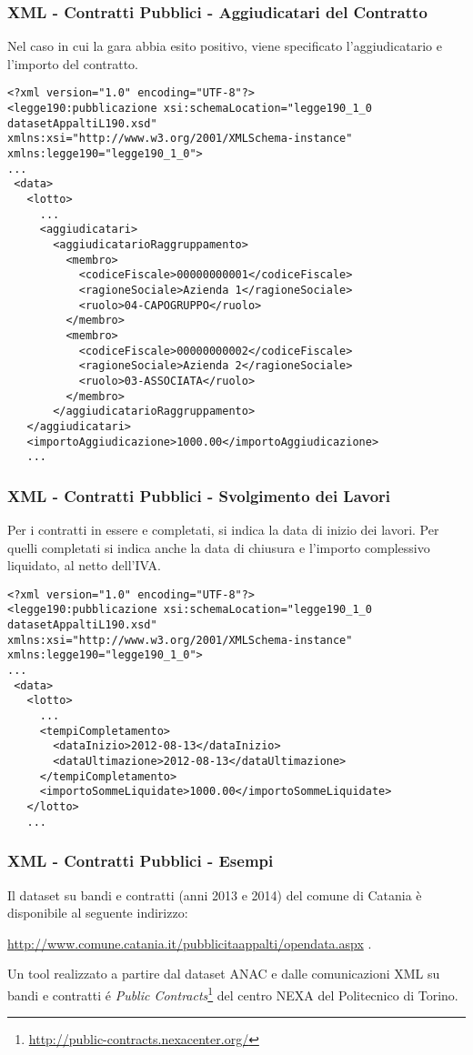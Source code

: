 \documentclass[8pt]{beamer}
\begin{document}
\begin{frame}[fragile]
 \frametitle{XML - Contratti Pubblici - Aggiudicatari del Contratto}
 Nel caso in cui la gara abbia esito positivo, viene specificato l'aggiudicatario
 e l'importo del contratto.
 
\begin{small}
\begin{verbatim}
<?xml version="1.0" encoding="UTF-8"?> 
<legge190:pubblicazione xsi:schemaLocation="legge190_1_0 datasetAppaltiL190.xsd"
xmlns:xsi="http://www.w3.org/2001/XMLSchema-instance" xmlns:legge190="legge190_1_0">
...
 <data>
   <lotto>
     ...
     <aggiudicatari>
       <aggiudicatarioRaggruppamento>
         <membro>
           <codiceFiscale>00000000001</codiceFiscale>
           <ragioneSociale>Azienda 1</ragioneSociale>
           <ruolo>04-CAPOGRUPPO</ruolo>
         </membro>
         <membro>
           <codiceFiscale>00000000002</codiceFiscale>
           <ragioneSociale>Azienda 2</ragioneSociale>
           <ruolo>03-ASSOCIATA</ruolo>
         </membro>
       </aggiudicatarioRaggruppamento>
   </aggiudicatari>
   <importoAggiudicazione>1000.00</importoAggiudicazione>
   ...
 \end{verbatim}
\end{small}
\end{frame}

\begin{frame}[fragile]
 \frametitle{XML - Contratti Pubblici - Svolgimento dei Lavori}
 Per i contratti in essere e completati, si indica la data di inizio dei lavori.
 Per quelli completati si indica anche la data di chiusura e l'importo complessivo
 liquidato, al netto dell'IVA.
\begin{small}
\begin{verbatim}
<?xml version="1.0" encoding="UTF-8"?> 
<legge190:pubblicazione xsi:schemaLocation="legge190_1_0 datasetAppaltiL190.xsd"
xmlns:xsi="http://www.w3.org/2001/XMLSchema-instance" xmlns:legge190="legge190_1_0">
...
 <data>
   <lotto>
     ...
     <tempiCompletamento>
       <dataInizio>2012-08-13</dataInizio>
       <dataUltimazione>2012-08-13</dataUltimazione>
     </tempiCompletamento>
     <importoSommeLiquidate>1000.00</importoSommeLiquidate>
   </lotto>
   ...
 \end{verbatim}
\end{small}
\end{frame}

\begin{frame}
 \frametitle{XML - Contratti Pubblici - Esempi}
 Il dataset su bandi e contratti (anni 2013 e 2014) del comune di Catania \`e
 disponibile al seguente indirizzo:
\begin{center}
 \begin{small}
  \url{http://www.comune.catania.it/pubblicitaappalti/opendata.aspx} .
 \end{small}
\end{center}

 Un tool realizzato a partire dal dataset ANAC e dalle comunicazioni XML 
 su bandi e contratti \'e \emph{Public Contracts}\footnote{\url{http://public-contracts.nexacenter.org/}} 
 del centro NEXA del Politecnico di Torino. 
\end{frame}
\end{document}
